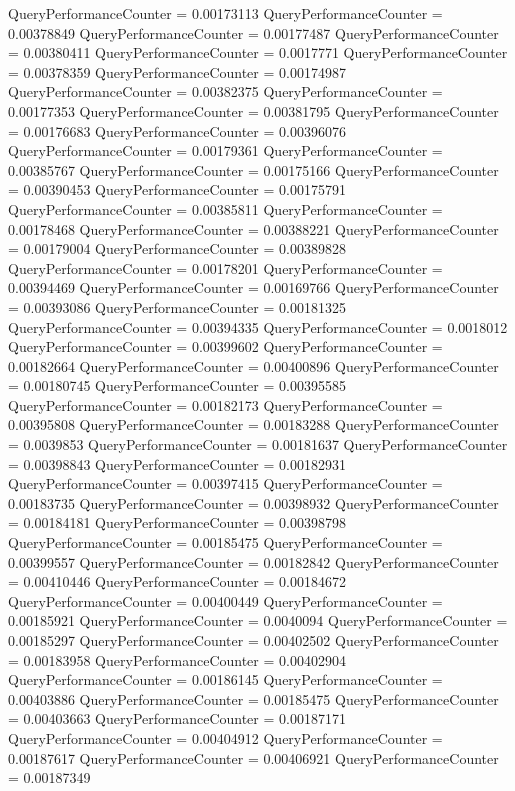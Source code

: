 \documentclass[9pt]{article}
\theoremstyle{plain}
\theoremstyle{definition}
\theoremstyle{remark}
\numberwithin{equation}{section}
\begin{document}
QueryPerformanceCounter  =  0.00173113
QueryPerformanceCounter  =  0.00378849
QueryPerformanceCounter  =  0.00177487
QueryPerformanceCounter  =  0.00380411
QueryPerformanceCounter  =  0.0017771
QueryPerformanceCounter  =  0.00378359
QueryPerformanceCounter  =  0.00174987
QueryPerformanceCounter  =  0.00382375
QueryPerformanceCounter  =  0.00177353
QueryPerformanceCounter  =  0.00381795
QueryPerformanceCounter  =  0.00176683
QueryPerformanceCounter  =  0.00396076
QueryPerformanceCounter  =  0.00179361
QueryPerformanceCounter  =  0.00385767
QueryPerformanceCounter  =  0.00175166
QueryPerformanceCounter  =  0.00390453
QueryPerformanceCounter  =  0.00175791
QueryPerformanceCounter  =  0.00385811
QueryPerformanceCounter  =  0.00178468
QueryPerformanceCounter  =  0.00388221
QueryPerformanceCounter  =  0.00179004
QueryPerformanceCounter  =  0.00389828
QueryPerformanceCounter  =  0.00178201
QueryPerformanceCounter  =  0.00394469
QueryPerformanceCounter  =  0.00169766
QueryPerformanceCounter  =  0.00393086
QueryPerformanceCounter  =  0.00181325
QueryPerformanceCounter  =  0.00394335
QueryPerformanceCounter  =  0.0018012
QueryPerformanceCounter  =  0.00399602
QueryPerformanceCounter  =  0.00182664
QueryPerformanceCounter  =  0.00400896
QueryPerformanceCounter  =  0.00180745
QueryPerformanceCounter  =  0.00395585
QueryPerformanceCounter  =  0.00182173
QueryPerformanceCounter  =  0.00395808
QueryPerformanceCounter  =  0.00183288
QueryPerformanceCounter  =  0.0039853
QueryPerformanceCounter  =  0.00181637
QueryPerformanceCounter  =  0.00398843
QueryPerformanceCounter  =  0.00182931
QueryPerformanceCounter  =  0.00397415
QueryPerformanceCounter  =  0.00183735
QueryPerformanceCounter  =  0.00398932
QueryPerformanceCounter  =  0.00184181
QueryPerformanceCounter  =  0.00398798
QueryPerformanceCounter  =  0.00185475
QueryPerformanceCounter  =  0.00399557
QueryPerformanceCounter  =  0.00182842
QueryPerformanceCounter  =  0.00410446
QueryPerformanceCounter  =  0.00184672
QueryPerformanceCounter  =  0.00400449
QueryPerformanceCounter  =  0.00185921
QueryPerformanceCounter  =  0.0040094
QueryPerformanceCounter  =  0.00185297
QueryPerformanceCounter  =  0.00402502
QueryPerformanceCounter  =  0.00183958
QueryPerformanceCounter  =  0.00402904
QueryPerformanceCounter  =  0.00186145
QueryPerformanceCounter  =  0.00403886
QueryPerformanceCounter  =  0.00185475
QueryPerformanceCounter  =  0.00403663
QueryPerformanceCounter  =  0.00187171
QueryPerformanceCounter  =  0.00404912
QueryPerformanceCounter  =  0.00187617
QueryPerformanceCounter  =  0.00406921
QueryPerformanceCounter  =  0.00187349
\end{document}
